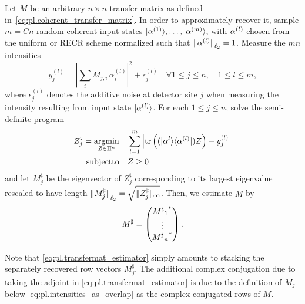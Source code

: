 \begin{protocol}%
  \label{prot:pl.detailed_reconstruction}
  Let ${M}$ be an arbitrary $n \times n$ transfer matrix as defined in~\eqref{eq:pl.coherent_transfer_matrix}.
  In order to approximately recover it, sample $m = Cn$ random coherent input states $\ket{{\alpha}^{(1)}},\ldots,\ket{{\alpha}^{(m)}}$, with $\alpha^{(l)}$ chosen from the uniform or RECR scheme normalized such that ${\Vert\alpha^{(l)}\Vert}_{\ell_2} = 1$.
  Measure the $mn$ intensities
  \[
    y_j^{(l)} = \left| \sum_i M_{j,i} \, \alpha_i^{(l)} \right|^2 + \epsilon_j^{(l)} \quad \forall 1 \leq j \leq n, \quad 1 \leq l \leq m,
  \]
  where $\epsilon_j^{(l)}$ denotes the additive noise at detector site $j$ when measuring the intensity resulting from input state  $\ket{{\alpha}^{(l)}}$.
  For each $1 \leq j \leq n$, solve the semi-definite program
  \begin{align}
    {Z}^\sharp_{j} = \underset{{Z} \in \mathbb{H}^n}{\operatorname{argmin}}& \quad \sum_{l=1}^m \left| \operatorname{tr} \left( (|{\alpha}^{l} \rangle \langle {\alpha}^{(l)} | )  Z \right) - y_j^{(l)} \right| \label{eq:tmat_recovery_program}\\
    \mathrm{subject to} & \quad {Z} \geq 0 \nonumber
  \end{align}
  and let ${M}_j^\sharp$ be the eigenvector of ${Z}^\sharp_{j}$ corresponding to its largest eigenvalue rescaled to have length ${\Vert{M}_j^\sharp\Vert}_{\ell_2} = \sqrt{ \| {Z}^\sharp_{j} \|_\infty}$.
  Then, we estimate ${M}$ by
  \[
    {M}^\sharp =
    \begin{pmatrix}
      {{{M^\sharp}_1}^\ast} \\ \vdots \\  {{{M^\sharp}_n}^\ast}
    \end{pmatrix}.
    \label{eq:pl.transfermat_estimator}
  \]
\end{protocol}

Note that \cref{eq:pl.transfermat_estimator} simply amounts to stacking the separately recovered row vectors $ M_j^\sharp$.
The additional complex conjugation due to taking the adjoint in \cref{eq:pl.transfermat_estimator} is due to the definition of $M_j$ below \cref{eq:pl.intensities_as_overlap} as the complex conjugated rows of $M$.

